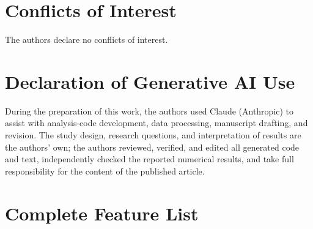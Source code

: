 \documentclass[12pt]{article}
\begin{document}
\section*{Conflicts of Interest}

The authors declare no conflicts of interest.

\section*{Declaration of Generative AI Use}

During the preparation of this work, the authors used Claude (Anthropic) to assist with
analysis-code development, data processing, manuscript drafting, and revision. The study
design, research questions, and interpretation of results are the authors' own; the authors
reviewed, verified, and edited all generated code and text, independently checked the reported
numerical results, and take full responsibility for the content of the published article.

\appendix
\section{Complete Feature List}
\label{app:features}
\end{document}
